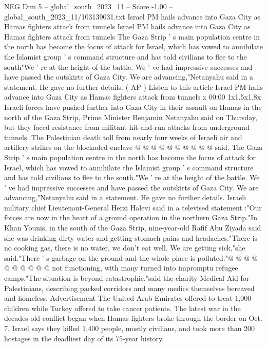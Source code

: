 \begin{textsample}{NEG Dim 5 – global\_south\_2023\_11 – Score -1.00 – global\_south\_2023\_11/103139031.txt}  \label{ex:f5_neg_205}
Israel PM hails advance into Gaza City as Hamas fighters attack from tunnels Israel PM hails advance into Gaza City as Hamas fighters attack from tunnels The Gaza Strip ' s main population centre in the north has become the focus of attack for Israel, which has vowed to annihilate the Islamist group ' s command structure and has told civilians to flee to the south"We ' re at the height of the battle.
We ' ve had impressive successes and have passed the outskirts of Gaza City.
We are advancing,"Netanyahu said in a statement.
He gave no further details. ( AP ) Listen to this article Israel PM hails advance into Gaza City as Hamas fighters attack from tunnels x 00:00 1x1.5x1.8x Israeli forces have pushed further into Gaza City in their assault on Hamas in the north of the Gaza Strip, Prime Minister Benjamin Netanyahu said on Thursday, but they faced resistance from militant hit-and-run attacks from underground tunnels.
The Palestinian death toll from nearly four weeks of Israeli air and artillery strikes on the blockaded enclave @ @ @ @ @ @ @ @ @ @ said.
The Gaza Strip ' s main population centre in the north has become the focus of attack for Israel, which has vowed to annihilate the Islamist group ' s command structure and has told civilians to flee to the south."We ' re at the height of the battle.
We ' ve had impressive successes and have passed the outskirts of Gaza City.
We are advancing,"Netanyahu said in a statement.
He gave no further details.
Israeli military chief Lieutenant-General Herzi Halevi said in a televised statement :"Our forces are now in the heart of a ground operation in the northern Gaza Strip."In Khan Younis, in the south of the Gaza Strip, nine-year-old Rafif Abu Ziyada said she was drinking dirty water and getting stomach pains and headaches."There is no cooking gas, there is no water, we don't eat well.
We are getting sick,"she said."There ' s garbage on the ground and the whole place is polluted."@ @ @ @ @ @ @ @ @ @ not functioning, with many turned into impromptu refugee camps."The situation is beyond catastrophic,"said the charity Medical Aid for Palestinians, describing packed corridors and many medics themselves bereaved and homeless.
Advertisement The United Arab Emirates offered to treat 1,000 children while Turkey offered to take cancer patients.
The latest war in the decades-old conflict began when Hamas fighters broke through the border on Oct. 7.
Israel says they killed 1,400 people, mostly civilians, and took more than 200 hostages in the deadliest day of its 75-year history.

\end{textsample}
